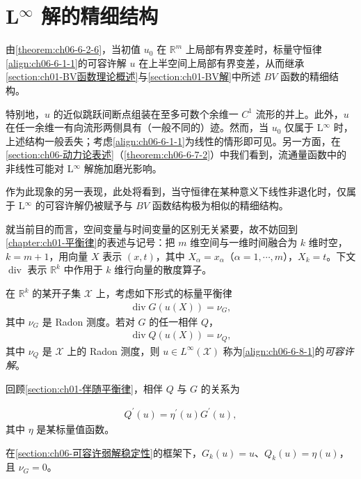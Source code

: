 \documentclass[../../main.tex]{subfiles}
\begin{document}
\section{L$^{\infty}$ 解的精细结构}\label{section:ch06-Linfty解精细结构}

由\cref{theorem:ch06-6-2-6}，当初值 $u_{0}$ 在 $\mathbb{R}^{m}$ 上局部有界变差时，标量守恒律\eqref{align:ch06-6-1-1}的可容许解 $u$ 在上半空间上局部有界变差，从而继承\cref{section:ch01-BV函数理论概述}与\cref{section:ch01-BV解}中所述 $BV$ 函数的精细结构。

特别地，$u$ 的近似跳跃间断点组装在至多可数个余维一 $C^{1}$ 流形的并上。此外，$u$ 在任一余维一有向流形两侧具有（一般不同的）迹。然而，当 $u_{0}$ 仅属于 L$^{\infty}$ 时，上述结构一般丢失；考虑\eqref{align:ch06-6-1-1}为线性的情形即可见。另一方面，在\cref{section:ch06-动力论表述}（\cref{theorem:ch06-6-7-2}）中我们看到，流通量函数中的非线性可能对 L$^{\infty}$ 解施加磨光影响。

作为此现象的另一表现，此处将看到，当守恒律在某种意义下线性非退化时，仅属于 L$^{\infty}$ 的可容许解仍被赋予与 $BV$ 函数结构极为相似的精细结构。

就当前目的而言，空间变量与时间变量的区别无关紧要，故不妨回到\cref{chapter:ch01-平衡律}的表述与记号：把 $m$ 维空间与一维时间融合为 $k$ 维时空，$k=m+1$，用向量 $X$ 表示 $(x,t)$，其中 $X_{\alpha}=x_{\alpha}$（$\alpha=1,\cdots,m$），$X_{k}=t$。下文 $\operatorname{div}$ 表示 $\mathbb{R}^{k}$ 中作用于 $k$ 维行向量的散度算子。


在 $\mathbb{R}^{k}$ 的某开子集 $\mathscr{X}$ 上，考虑如下形式的标量平衡律
\begin{align}
\operatorname{div}G(u(X))=\nu_{G},
\label{align:ch06-6-8-1}
\end{align}
其中 $\nu_{G}$ 是 Radon 测度。若对 $G$ 的任一相伴 $Q$，
\begin{align}
\operatorname{div}Q(u(X))=\nu_{Q},
\label{align:ch06-6-8-2}
\end{align}
其中 $\nu_{Q}$ 是 $\mathscr{X}$ 上的 Radon 测度，则 $u\in L^{\infty}(\mathscr{X})$ 称为\eqref{align:ch06-6-8-1}的\emph{可容许解}。

回顾\cref{section:ch01-伴随平衡律}，相伴 $Q$ 与 $G$ 的关系为

\begin{align}
Q^{\prime}(u)=\eta^{\prime}(u)G^{\prime}(u),
\label{align:ch06-6-8-3}
\end{align}
其中 $\eta$ 是某标量值函数。

在\cref{section:ch06-可容许弱解稳定性}的框架下，$G_{k}(u)=u$、$Q_{k}(u)=\eta(u)$，且 $\nu_{G}=0$。
\end{document}
